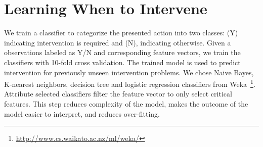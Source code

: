 \documentclass[letterpaper]{article}
\theoremstyle{plain}
\begin{document}

\section{Learning When to Intervene}
We train a classifier to categorize the presented action into two classes: (Y) indicating intervention is required and (N), indicating otherwise. Given a observations labeled as Y/N and corresponding feature vectors, we train the classifiers with 10-fold cross validation. The trained model is used to predict intervention for previously unseen intervention problems. We chose Naive Bayes, K-nearest neighbors, decision tree and logistic regression classifiers from Weka~\footnote{\url{http://www.cs.waikato.ac.nz/ml/weka/}}. Attribute selected classifiers filter the feature vector to only select critical features. This step reduces complexity of the model, makes the outcome of the model easier to interpret, and reduces over-fitting.
\end{document}
